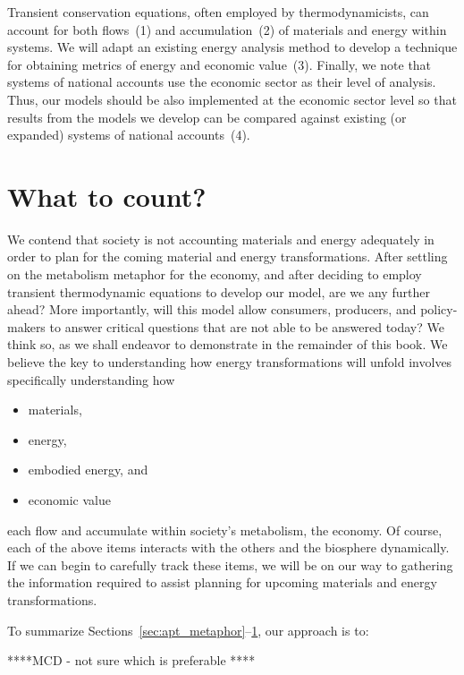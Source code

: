 Transient conservation equations, often employed by thermodynamicists, 
can account for both flows~(1) and accumulation~(2) of materials
and energy within systems.
We will adapt an existing energy analysis method to develop a 
technique for obtaining metrics of energy and economic value~(3).
Finally, we note that systems of national accounts use the economic sector
as their level of analysis. 
Thus, our models should be also implemented at the economic sector level
so that results from the models we develop can be 
compared against existing (or expanded) systems of national accounts~(4).


\section{What to count?}
\label{sec:what_to_count}

We contend that society is not accounting materials and energy adequately 
in order to plan for the coming material and energy transformations.
After settling on the metabolism metaphor for the economy, 
and after deciding to employ transient thermodynamic equations to develop our model, 
are we any further ahead?
More importantly, will this model allow consumers, producers,
and policy-makers to answer critical questions that  are not
able to be answered today? 
We think so, as we shall endeavor to demonstrate in the remainder of this book.
We believe the key to understanding how energy transformations will unfold
involves specifically understanding how

\begin{itemize}
	\item{materials,}
	\item{energy,}
	\item{embodied energy, and}
	\item{economic value}
\end{itemize}

\noindent{}each flow and accumulate within society's metabolism, the economy.
Of course, each of the above items interacts with the others 
and the biosphere dynamically.
If we can begin to carefully track these items, 
we will be on our way to gathering the information required to 
assist planning for upcoming materials and energy transformations.

To summarize Sections~\ref{sec:apt_metaphor}--\ref{sec:what_to_count}, 
our approach is to:

****MCD - not sure which is preferable **** 
 
